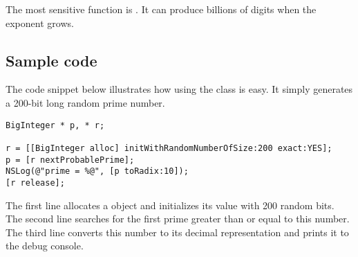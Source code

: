 The most sensitive function is . It can produce billions of digits when the exponent grows. 

\subsection{Sample code}

The code snippet below illustrates how using the  class is easy. It simply generates a 200-bit long random prime number.

\begin{Verbatim}[frame=single, framesep=2mm, rulecolor=\color{rulecolor}]
BigInteger * p, * r;

r = [[BigInteger alloc] initWithRandomNumberOfSize:200 exact:YES];
p = [r nextProbablePrime];
NSLog(@"prime = %@", [p toRadix:10]);
[r release];
\end{Verbatim}

The first line allocates a  object and initializes its value with 200 random bits. The second line searches for the first prime greater than or equal to this number. The third line converts this number to its decimal representation and prints it to the debug console.
